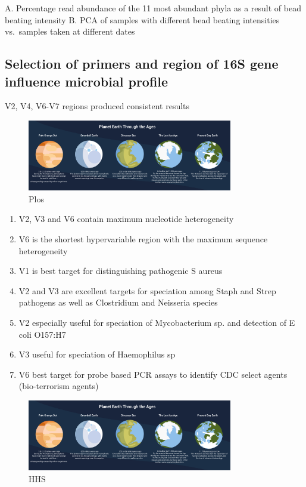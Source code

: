 \documentclass[
]{book}
\providecommand{\tightlist}{%
  \setlength{\itemsep}{0pt}\setlength{\parskip}{0pt}}
\begin{document}
A. Percentage read abundance of the 11 most abundant phyla as a result of bead beating intensity
B. PCA of samples with different bead beating intensities vs.~samples taken at different dates

\hypertarget{selection-of-primers-and-region-of-16s-gene-influence-microbial-profile}{%
\subsection{Selection of primers and region of 16S gene influence microbial profile}\label{selection-of-primers-and-region-of-16s-gene-influence-microbial-profile}}

V2, V4, V6-V7 regions produced consistent results

\begin{figure}
\centering
\includegraphics[width=0.8\textwidth,height=\textheight]{./Figures/Planets.png}
\caption{Plos}
\end{figure}

\begin{enumerate}
\def\labelenumi{\arabic{enumi}.}
\tightlist
\item
  V2, V3 and V6 contain maximum nucleotide heterogeneity
\item
  V6 is the shortest hypervariable region
  with the maximum sequence
  heterogeneity
\item
  V1 is best target for distinguishing
  pathogenic S aureus
\item
  V2 and V3 are excellent targets for
  speciation among Staph and Strep pathogens as well as Clostridium and Neisseria species
\item
  V2 especially useful for speciation of Mycobacterium sp. and detection of E coli O157:H7
\item
  V3 useful for speciation of
  Haemophilus sp
\item
  V6 best target for probe based PCR assays to identify CDC select agents (bio-terrorism agents)
\end{enumerate}

\begin{figure}
\centering
\includegraphics[width=0.8\textwidth,height=\textheight]{./Figures/Planets.png}
\caption{HHS}
\end{figure}
\end{document}
